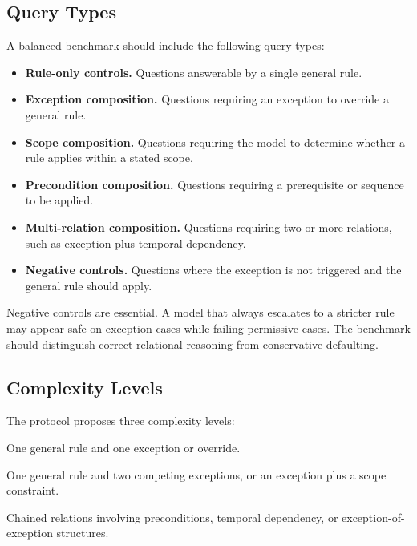 \documentclass[11pt]{article}
\begin{document}
\subsection{Query Types}

A balanced benchmark should include the following query types:

\begin{itemize}[leftmargin=*,itemsep=2pt]
    \item \textbf{Rule-only controls.} Questions answerable by a single general rule.
    \item \textbf{Exception composition.} Questions requiring an exception to override a general rule.
    \item \textbf{Scope composition.} Questions requiring the model to determine whether a rule applies within a stated scope.
    \item \textbf{Precondition composition.} Questions requiring a prerequisite or sequence to be applied.
    \item \textbf{Multi-relation composition.} Questions requiring two or more relations, such as exception plus temporal dependency.
    \item \textbf{Negative controls.} Questions where the exception is not triggered and the general rule should apply.
\end{itemize}

Negative controls are essential. A model that always escalates to a stricter rule may appear safe on exception cases while failing permissive cases. The benchmark should distinguish correct relational reasoning from conservative defaulting.

\subsection{Complexity Levels}

The protocol proposes three complexity levels:

\begin{description}[style=nextline,leftmargin=1em,itemsep=2pt]
    \item[Level 1.] One general rule and one exception or override.
    \item[Level 2.] One general rule and two competing exceptions, or an exception plus a scope constraint.
    \item[Level 3.] Chained relations involving preconditions, temporal dependency, or exception-of-exception structures.
\end{description}
\end{document}
